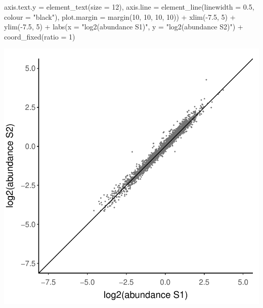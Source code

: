 \documentclass[9pt,a4paper,]{extarticle}
\newenvironment{Shaded}{\begin{snugshade}}{\end{snugshade}}
\newcommand{\AttributeTok}[1]{\textcolor[rgb]{0.77,0.63,0.00}{#1}}
\newcommand{\DecValTok}[1]{\textcolor[rgb]{0.00,0.00,0.81}{#1}}
\newcommand{\FloatTok}[1]{\textcolor[rgb]{0.00,0.00,0.81}{#1}}
\newcommand{\FunctionTok}[1]{\textcolor[rgb]{0.00,0.00,0.00}{#1}}
\newcommand{\NormalTok}[1]{#1}
\newcommand{\SpecialCharTok}[1]{\textcolor[rgb]{0.00,0.00,0.00}{#1}}
\newcommand{\StringTok}[1]{\textcolor[rgb]{0.31,0.60,0.02}{#1}}
\begin{document}
\begin{Shaded}
\begin{Highlighting}[]
        \AttributeTok{axis.text.y =} \FunctionTok{element\_text}\NormalTok{(}\AttributeTok{size =} \DecValTok{12}\NormalTok{),}
        \AttributeTok{axis.line =} \FunctionTok{element\_line}\NormalTok{(}\AttributeTok{linewidth =} \FloatTok{0.5}\NormalTok{, }\AttributeTok{colour =} \StringTok{"black"}\NormalTok{),}
        \AttributeTok{plot.margin =} \FunctionTok{margin}\NormalTok{(}\DecValTok{10}\NormalTok{, }\DecValTok{10}\NormalTok{, }\DecValTok{10}\NormalTok{, }\DecValTok{10}\NormalTok{)) }\SpecialCharTok{+}
  \FunctionTok{xlim}\NormalTok{(}\SpecialCharTok{{-}}\FloatTok{7.5}\NormalTok{, }\DecValTok{5}\NormalTok{) }\SpecialCharTok{+}
  \FunctionTok{ylim}\NormalTok{(}\SpecialCharTok{{-}}\FloatTok{7.5}\NormalTok{, }\DecValTok{5}\NormalTok{) }\SpecialCharTok{+}
  \FunctionTok{labs}\NormalTok{(}\AttributeTok{x =} \StringTok{"log2(abundance S1)"}\NormalTok{, }\AttributeTok{y =} \StringTok{"log2(abundance S2)"}\NormalTok{) }\SpecialCharTok{+}
  \FunctionTok{coord\_fixed}\NormalTok{(}\AttributeTok{ratio =} \DecValTok{1}\NormalTok{)}
\end{Highlighting}
\end{Shaded}

\begin{center}\includegraphics[height=0.3\textheight]{workflow_expressions_files/figure-latex/correlation_plot_2-1} \end{center}
\end{document}
